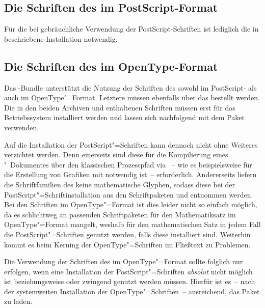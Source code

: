 \begin{Declaration*}{}
\begin{Declaration*}{}
\begin{Declaration*}{}
\subsection{Die Schriften des \CDs im PostScript-Format}
%
%
Für die bei  gebräuchliche Verwendung der PostScript-Schriften 
ist lediglich die in  beschriebene Installation notwendig. 


\subsection{Die Schriften des \CDs im OpenType-Format}
%
%
%
Das \TUDScript-Bundle unterstützt die Nutzung der Schriften des \CDs sowohl 
im PostScript- als auch im OpenType"=Format. Letztere müssen ebenfalls über das 
 bestellt werden. Die in den beiden Archiven  und 
 enthaltenen Schriften müssen erst für das Betriebssystem 
installiert werden und lassen sich nachfolgend mit dem Paket  
verwenden.

Auf die Installation der PostScript"=Schriften kann dennoch nicht ohne Weiteres 
verzichtet werden. Denn einerseits sind diese für die Kompilierung eines 
"~Dokumentes über den klassischen Prozesspfad via
~-- wie es 
beispielsweise für die Erstellung von Grafiken mit  notwendig 
ist~-- erforderlich. Andererseits liefern die Schriftfamilien des \CDs keine 
mathematische Glyphen, sodass diese bei der PostScript"=Schriftinstallation aus 
den Schriftpaketen  und  entnommen werden. Bei 
den Schriften im OpenType"=Format ist dies leider nicht so einfach möglich, da 
es schlichtweg an passenden Schriftpaketen für den Mathematiksatz im 
OpenType"=Format mangelt, weshalb für den mathematischen Satz in jedem Fall die 
PostScript"=Schriften genutzt werden, falls diese installiert sind. Weiterhin 
kommt es beim Kerning der OpenType"=Schriften im Fließtext zu Problemen.

Die Verwendung der Schriften des \CDs im OpenType"=Format sollte folglich nur 
erfolgen, wenn eine Installation der PostScript"=Schriften \emph{absolut} nicht 
möglich ist beziehungsweise  oder  zwingend 
genutzt werden müssen. Hierfür ist es~-- nach der systemweiten Installation der 
OpenType"=Schriften~-- ausreichend, das Paket  zu laden.
%




\end{Declaration*}
\end{Declaration*}
\end{Declaration*}
